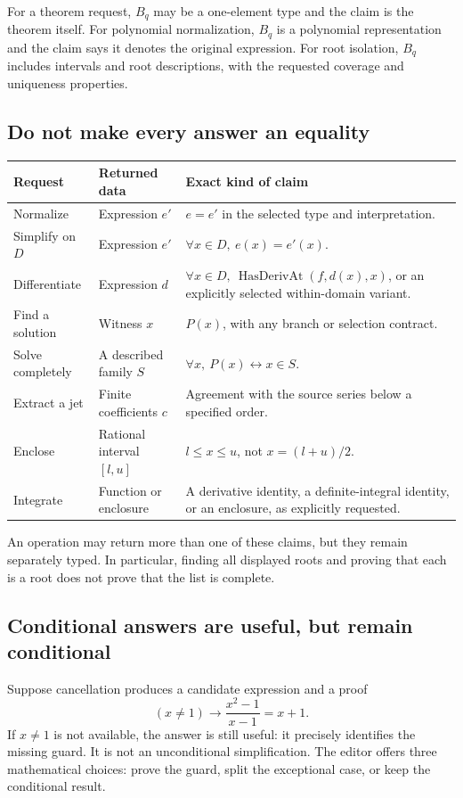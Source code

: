 \documentclass[11pt,a4paper]{article}
\theoremstyle{definition}
\theoremstyle{remark}
\begin{document}
For a theorem request, $B_q$ may be a one-element type and the claim is the theorem itself. For polynomial normalization, $B_q$ is a polynomial representation and the claim says it denotes the original expression. For root isolation, $B_q$ includes intervals and root descriptions, with the requested coverage and uniqueness properties.

\subsection{Do not make every answer an equality}
\begin{longtable}{@{}P{.18\textwidth}P{.29\textwidth}P{.45\textwidth}@{}}
\toprule
Request & Returned data & Exact kind of claim\\
\midrule
\endhead
Normalize & Expression $e'$ & $e=e'$ in the selected type and interpretation.\\
Simplify on $D$ & Expression $e'$ & $\forall x\in D,\ e(x)=e'(x)$.\\
Differentiate & Expression $d$ & $\forall x\in D,\ \operatorname{HasDerivAt}(f,d(x),x)$, or an explicitly selected within-domain variant.\\
Find a solution & Witness $x$ & $P(x)$, with any branch or selection contract.\\
Solve completely & A described family $S$ & $\forall x,\ P(x)\leftrightarrow x\in S$.\\
Extract a jet & Finite coefficients $c$ & Agreement with the source series below a specified order.\\
Enclose & Rational interval $[l,u]$ & $l\le x\le u$, not $x=(l+u)/2$.\\
Integrate & Function or enclosure & A derivative identity, a definite-integral identity, or an enclosure, as explicitly requested.\\
\bottomrule
\end{longtable}
An operation may return more than one of these claims, but they remain separately typed. In particular, finding all displayed roots and proving that each is a root does not prove that the list is complete.

\subsection{Conditional answers are useful, but remain conditional}
Suppose cancellation produces a candidate expression and a proof
\[
(x\ne1)\longrightarrow \frac{x^2-1}{x-1}=x+1.
\]
If $x\ne1$ is not available, the answer is still useful: it precisely identifies the missing guard. It is not an unconditional simplification. The editor offers three mathematical choices: prove the guard, split the exceptional case, or keep the conditional result.
\end{document}
